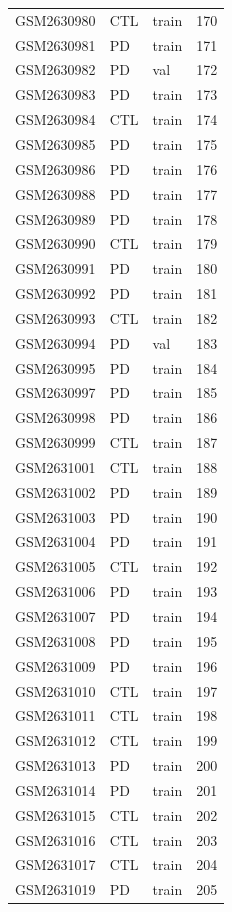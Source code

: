 \begin{footnotesize}
\begin{longtable}{llll}
GSM2630980 & CTL & train & 170 \\
GSM2630981 & PD & train & 171 \\
GSM2630982 & PD & val & 172 \\
GSM2630983 & PD & train & 173 \\
GSM2630984 & CTL & train & 174 \\
GSM2630985 & PD & train & 175 \\
GSM2630986 & PD & train & 176 \\
GSM2630988 & PD & train & 177 \\
GSM2630989 & PD & train & 178 \\
GSM2630990 & CTL & train & 179 \\
GSM2630991 & PD & train & 180 \\
GSM2630992 & PD & train & 181 \\
GSM2630993 & CTL & train & 182 \\
GSM2630994 & PD & val & 183 \\
GSM2630995 & PD & train & 184 \\
GSM2630997 & PD & train & 185 \\
GSM2630998 & PD & train & 186 \\
GSM2630999 & CTL & train & 187 \\
GSM2631001 & CTL & train & 188 \\
GSM2631002 & PD & train & 189 \\
GSM2631003 & PD & train & 190 \\
GSM2631004 & PD & train & 191 \\
GSM2631005 & CTL & train & 192 \\
GSM2631006 & PD & train & 193 \\
GSM2631007 & PD & train & 194 \\
GSM2631008 & PD & train & 195 \\
GSM2631009 & PD & train & 196 \\
GSM2631010 & CTL & train & 197 \\
GSM2631011 & CTL & train & 198 \\
GSM2631012 & CTL & train & 199 \\
GSM2631013 & PD & train & 200 \\
GSM2631014 & PD & train & 201 \\
GSM2631015 & CTL & train & 202 \\
GSM2631016 & CTL & train & 203 \\
GSM2631017 & CTL & train & 204 \\
GSM2631019 & PD & train & 205 \\

\end{longtable}
\end{footnotesize}
